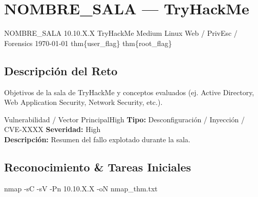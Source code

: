 \documentclass[../../../main_compilation.tex]{subfiles}
\begin{document}
\section[THM - NOMBRE\_SALA (10.10.X.X)]{NOMBRE\_SALA — TryHackMe}
\label{sec:thm-nombre-sala}

\targetSummary%
{NOMBRE\_SALA}%
{10.10.X.X}%
{TryHackMe}%
{Medium}%
{Linux}%
{Web / PrivEsc / Forensics}%
{\today}%
{thm\{user\_flag\}}%
{thm\{root\_flag\}}%

\vspace{0.4cm}

\subsection{Descripción del Reto}
Objetivos de la sala de TryHackMe y conceptos evaluados (ej. Active Directory, Web Application Security, Network Security, etc.).

\begin{vulnbox}{Vulnerabilidad / Vector Principal}{High}
	\textbf{Tipo:} Desconfiguración / Inyección / CVE-XXXX \hfill \textbf{Severidad:} High\\
	\textbf{Descripción:} Resumen del fallo explotado durante la sala.
\end{vulnbox}

\subsection{Reconocimiento \& Tareas Iniciales}

\begin{terminal}
	nmap -sC -sV -Pn 10.10.X.X -oN nmap_thm.txt
\end{terminal}
\end{document}
